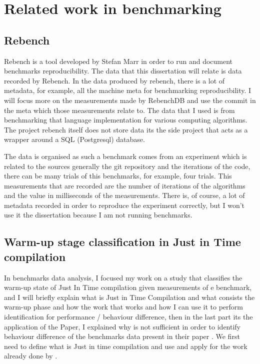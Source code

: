\documentclass{article}
\begin{document}
\section{Related work in benchmarking}

\subsection{Rebench}

Rebench is a tool developed by Stefan Marr in order to run and document benchmarks reproducibility. The data that this dissertation will relate is data recorded by Rebench. In the data produced by rebench, there is a lot of metadata, for example, all the machine meta for benchmarking reproducibility. I will focus more on the measurements made by RebenchDB and use the commit in the meta which those measurements relate to. The data that I used is from benchmarking that language implementation for various computing algorithms. The project rebench itself does not store data its the side project that acts as a wrapper around a SQL (Postgresql) database.

The data is organised as such a benchmark comes from an experiment which is related to the sources generally the git repository and the iterations of the code, there can be many trials of this benchmarks, for example, four trials. This measurements that are recorded are the number of iterations of the algorithms and the value in milliseconds of the measurements. There is, of course, a lot of metadata recorded in order to reproduce the experiment correctly, but I won't use it the dissertation because I am not running benchmarks.

\subsection{Warm-up stage classification in Just in Time compilation}

In benchmarks data analysis, I focused my work on a study that classifies the warm-up state of Just In Time compilation given measurements of e benchmark, and I will briefly explain what is Just in Time Compilation and what consists the warm-up phase and how the work that \citep{barrett2017virtual} works and how I can use it to perform identification for performance / behaviour difference, then in the last part its the application of the Paper, I explained why is not sufficient in order to identify behaviour difference of the benchmarks data  present in their paper . We first need to define what is Just in time compilation and use and apply for the work already done by \citep{barrett2017virtual}.
\end{document}
